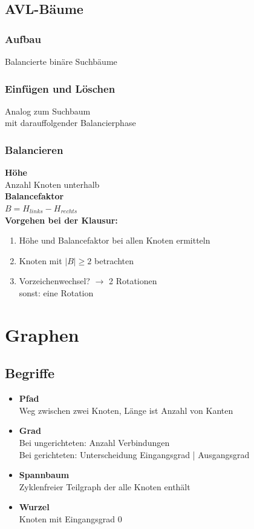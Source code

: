 \documentclass{article}
\begin{document}
	\subsection{AVL-Bäume}
	\subsubsection*{Aufbau}
	Balancierte binäre Suchbäume
	\subsubsection*{Einfügen und Löschen}
	Analog zum Suchbaum
	\\mit darauffolgender Balancierphase
	\subsubsection{Balancieren}
	\textbf{Höhe}
	\\Anzahl Knoten unterhalb
	\\\textbf{Balancefaktor}
	\\$B = H_{links} - H_{rechts}$
	\\\textbf{Vorgehen bei der Klausur:} 
	\begin{enumerate}
		\item Höhe und Balancefaktor bei allen Knoten ermitteln
		\item Knoten mit $|B| \geq 2$ betrachten
		\item Vorzeichenwechsel? $\rightarrow$ 2 Rotationen
		\\sonst: eine Rotation
	\end{enumerate}
	\section{Graphen}
	\subsection{Begriffe}
	\begin{itemize}
		\item \textbf{Pfad}
		\\Weg zwischen zwei Knoten, Länge ist Anzahl von Kanten
		\item \textbf{Grad}
		\\Bei ungerichteten: Anzahl Verbindungen
		\\Bei gerichteten: Unterscheidung Eingangsgrad | Ausgangsgrad
		\item \textbf{Spannbaum}
		\\Zyklenfreier Teilgraph der alle Knoten enthält
		\item \textbf{Wurzel}
		\\Knoten mit Eingangsgrad 0
	\end{itemize}
\end{document}
